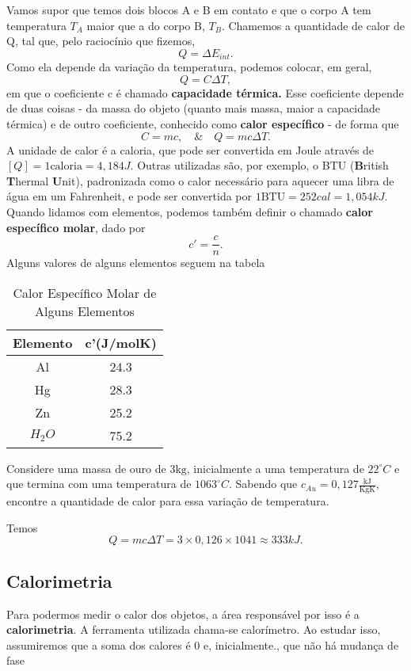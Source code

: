 \documentclass[phsyicsII_notes.tex]{subfiles}
\begin{document}
Vamos supor que temos dois blocos A e B em contato e que o corpo A tem temperatura \(T_{A} \) maior que a do corpo B, \(T_{B}\).
Chamemos a quantidade de calor de Q, tal que, pelo raciocínio que fizemos,
\[
	Q = \Delta E_{int}.
\]
Como ela depende da variação da temperatura, podemos colocar, em geral,
\[
	Q = C\Delta T,
\]
em que o coeficiente c é chamado \textbf{capacidade térmica.} Esse coeficiente depende de duas coisas - da massa do objeto (quanto mais massa, maior a capacidade térmica)
e de outro coeficiente, conhecido como \textbf{calor específico} - de forma que
\[
	C = mc,\quad \&\quad Q = mc\Delta T.
\]
A unidade de calor é a caloria, que pode ser convertida em Joule através de \([Q] = 1\text{caloria} = 4,184J.\) Outras utilizadas são, por exemplo,
o BTU (\textbf{B}ritish \textbf{T}hermal \textbf{U}nit), padronizada como o calor necessário para aquecer uma libra de água em um Fahrenheit, e pode ser convertida por
\(1\text{BTU} = 252cal = 1,054kJ.\) Quando lidamos com elementos, podemos também definir o chamado \textbf{calor específico molar}, dado por
\[
	c'= \frac{c}{n}.
\]
Alguns valores de alguns elementos seguem na tabela
\begin{center}
	\begin{table}[h!]
		\caption{Calor Específico Molar de Alguns Elementos}
		\centering
		\begin{tabular}{| c | c |}
			\hline
			Elemento   & c'(J/molK) \\
			\hline
			Al         & 24.3       \\
			Hg         & 28.3       \\
			Zn         & 25.2       \\
			\(H_{2}O\) & 75.2       \\
			\hline
		\end{tabular}
	\end{table}
\end{center}
\begin{example}
	Considere uma massa de ouro de \(3\text{kg}\), inicialmente a uma temperatura de \(22^{\circ{}}C\) e que termina com
	uma temperatura de \(1063^{\circ{}}C\). Sabendo que \(c_{Au}=0,127\frac{\text{kJ}}{\text{KgK}},\) encontre a quantidade de calor para essa
	variação de temperatura.

	Temos
	\[
		Q = mc\Delta T = 3\times 0,126\times 1041\approx 333kJ.
	\]
\end{example}
\subsection{Calorimetria}
Para podermos medir o calor dos objetos, a área responsável por isso é a \textbf{calorimetria}. A ferramenta utilizada chama-se calorímetro.
Ao estudar isso, assumiremos que a soma dos calores é 0 e, inicialmente., que não há mudança de fase
\end{document}
